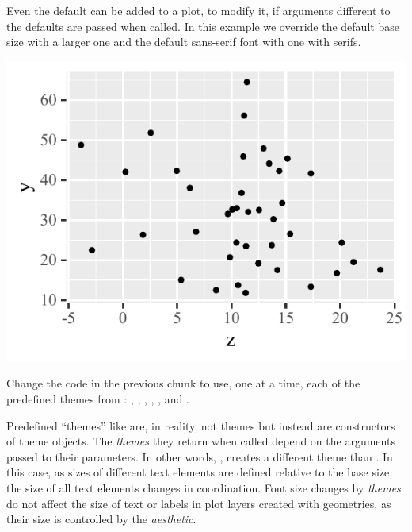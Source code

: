 \documentclass[krantz2]{krantz}\usepackage{knitr}
\begin{document}
Even the default  can be added to a plot, to modify it, if arguments different to the defaults are passed when called. In this example we override the default base size with a larger one and the default sans-serif font with one with serifs.

\begin{knitrout}\footnotesize
{}\color{fgcolor}\begin{kframe}
\begin{alltt}
  \hlopt{+}
  \hlstd{()} \hlopt{+}
  \hlstd{(} \hlstd{=} \hlstd{,}
              \hlstd{=} \hlstd{)}
\end{alltt}
\end{kframe}

{\centering \includegraphics[width=.495\textwidth]{figure/pos-themes-01-1} 

}


\end{knitrout}

\begin{playground}
Change the code in the previous chunk to use, one at a time, each of the predefined themes from \ggplot: , , , , ,  and .
\end{playground}

\begin{explainbox}
Predefined ``themes'' like  are, in reality, not themes but instead are constructors of theme objects. The \emph{themes} they return when called depend on the arguments passed to their parameters. In other words, , creates a different theme than . In this case, as sizes of different text elements are defined relative to the base size, the size of all text elements changes in coordination. Font size changes by \emph{themes} do not affect the size of text or labels in plot layers created with geometries, as their size is controlled by the  \emph{aesthetic}.
\end{explainbox}
\end{document}
